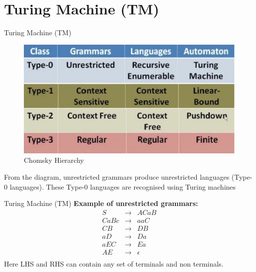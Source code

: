 \documentclass{beamer}
\begin{document}
\section{Turing Machine (TM)}
\begin{frame}{Turing Machine (TM)}
	\begin{figure}
		\includegraphics[scale=.5]{img5/m2}
		\caption{ Chomsky Hierarchy}
	\end{figure}
From the diagram, unrestricted grammars produce unrestricted languages (Type-0 languages). These Type-0 languages are recognised using Turing machines
\end{frame}
\begin{frame}{Turing Machine (TM)}
\textbf{Example of unrestricted grammars:}
\begin{eqnarray*}
	S &\rightarrow & ACaB \\
	CaBc &\rightarrow & aaC \\
	CB &\rightarrow & DB \\
	aD &\rightarrow & Da \\
	aEC &\rightarrow & Ea \\ 
	AE &\rightarrow & \epsilon \\
\end{eqnarray*}
Here LHS and RHS can contain any set of terminals and non terminals.
\end{frame}
\end{document}
